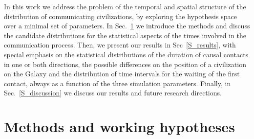 \documentclass[crop]{CSLB}%
\begin{document}

In this work we address the problem of the temporal and spatial
structure of the distribution of communicating civilizations, by
exploring the hypothesis space over a minimal set of parameters.
%
In Sec.~\ref{S_methods} we introduce the methods and discuss the
candidate distributions for the statistical aspects of the times
involved in the communication process.
%
Then, we present our results in Sec~\ref{S_results}, with special
emphasis on the statistical distributions of the duration of causal
contacts in one or both directions, the possible differences on the
position of a civilization on the Galaxy and the distribution of time
intervals for the waiting of the first contact, always as a function
of the three simulation parameters.
%
Finally, in Sec.~\ref{S_discussion} we discuss our results and future
research directions.





\section{Methods and working hypotheses}\label{S_methods}
\end{document}
